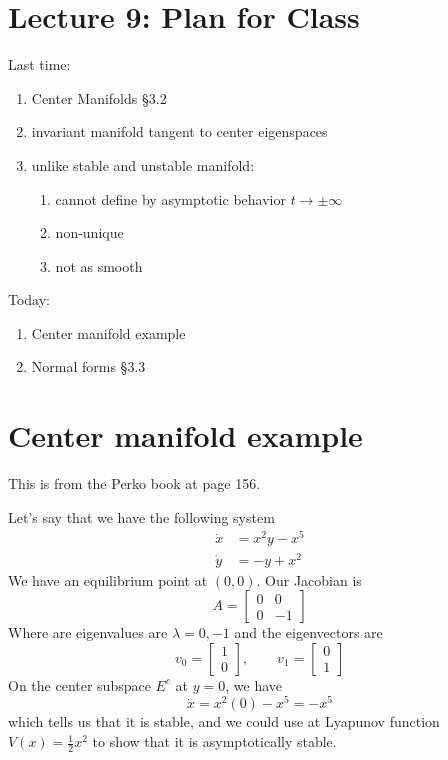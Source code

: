 \documentclass{article}
\begin{document}
\section{Lecture 9: Plan for Class}
Last time:
\begin{enumerate}
    \item Center Manifolds \S 3.2
    \item invariant manifold tangent to center eigenspaces
    \item unlike stable and unstable manifold:
    \begin{enumerate}
        \item cannot define by asymptotic behavior $t\to\pm\infty$
        \item non-unique
        \item not as smooth
    \end{enumerate}
\end{enumerate}

Today:
\begin{enumerate}
    \item Center manifold example
    \item Normal forms \S 3.3
\end{enumerate}

\section{Center manifold example}
This is from the Perko book at page 156.

Let's say that we have the following system
\begin{align*}
    \dot{x}&=x^2y-x^5\\
    \dot{y}&=-y+x^2
\end{align*}
We have an equilibrium point at $(0,0)$. Our Jacobian is 
\[
A = \begin{bmatrix}
    0 & 0\\0 & -1
\end{bmatrix}
\]
Where are eigenvalues are $\lambda=0,-1$ and the eigenvectors are 
\[
v_0 = \begin{bmatrix}
    1\\0
\end{bmatrix},\qquad v_1=\begin{bmatrix}
    0\\1
\end{bmatrix}
\]
On the center subspace $E^c$ at $y=0$, we have 
\[\dot{x}=x^2(0)-x^5=-x^5\]
which tells us that it is stable, and we could use at Lyapunov function $V(x)=\frac{1}{2}x^2$ to show that it is asymptotically stable.
\end{document}

